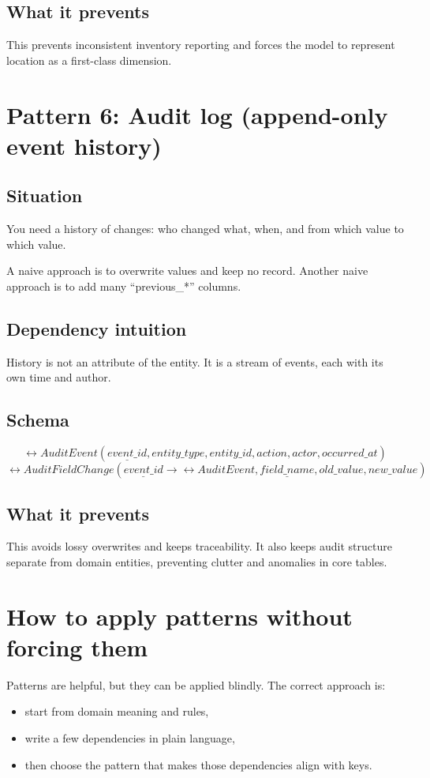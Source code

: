 \subsection{What it prevents}
This prevents inconsistent inventory reporting and forces the model to represent location as a first-class dimension.

\section{Pattern 6: Audit log (append-only event history)}
\subsection{Situation}
You need a history of changes: who changed what, when, and from which value to which value.

A naive approach is to overwrite values and keep no record.
Another naive approach is to add many “previous\_*” columns.

\subsection{Dependency intuition}
History is not an attribute of the entity.
It is a stream of events, each with its own time and author.

\subsection{Schema}
\[
\rel{AuditEvent}(\underline{event\_id}, entity\_type, entity\_id, action, actor, occurred\_at)
\]
\[
\rel{AuditFieldChange}(\underline{event\_id} \rightarrow \rel{AuditEvent}, \underline{field\_name}, old\_value, new\_value)
\]

\subsection{What it prevents}
This avoids lossy overwrites and keeps traceability.
It also keeps audit structure separate from domain entities, preventing clutter and anomalies in core tables.

\section{How to apply patterns without forcing them}
Patterns are helpful, but they can be applied blindly.
The correct approach is:
\begin{itemize}
  \item start from domain meaning and rules,
  \item write a few dependencies in plain language,
  \item then choose the pattern that makes those dependencies align with keys.
\end{itemize}

